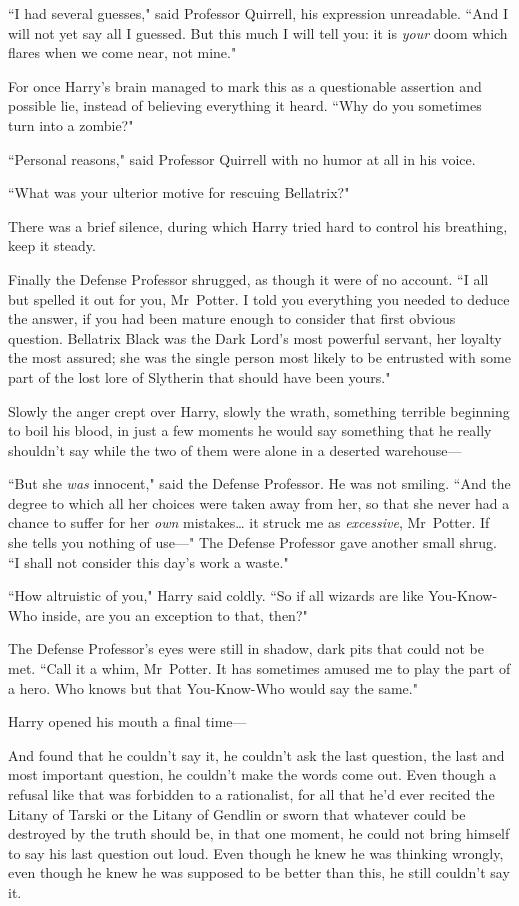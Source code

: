 ``I had several guesses," said Professor Quirrell, his expression unreadable. ``And I will not yet say all I guessed. But this much I will tell you: it is \emph{your} doom which flares when we come near, not mine."

For once Harry's brain managed to mark this as a questionable assertion and possible lie, instead of believing everything it heard. ``Why do you sometimes turn into a zombie?"

``Personal reasons," said Professor Quirrell with no humor at all in his voice.

``What was your ulterior motive for rescuing Bellatrix?"

There was a brief silence, during which Harry tried hard to control his breathing, keep it steady.

Finally the Defense Professor shrugged, as though it were of no account. ``I all but spelled it out for you, Mr~Potter. I told you everything you needed to deduce the answer, if you had been mature enough to consider that first obvious question. Bellatrix Black was the Dark Lord's most powerful servant, her loyalty the most assured; she was the single person most likely to be entrusted with some part of the lost lore of Slytherin that should have been yours."

Slowly the anger crept over Harry, slowly the wrath, something terrible beginning to boil his blood, in just a few moments he would say something that he really shouldn't say while the two of them were alone in a deserted warehouse—

``But she \emph{was} innocent," said the Defense Professor. He was not smiling. ``And the degree to which all her choices were taken away from her, so that she never had a chance to suffer for her \emph{own} mistakes{\ldots} it struck me as \emph{excessive}, Mr~Potter. If she tells you nothing of use—" The Defense Professor gave another small shrug. ``I shall not consider this day's work a waste."

``How altruistic of you," Harry said coldly. ``So if all wizards are like You-Know-Who inside, are you an exception to that, then?"

The Defense Professor's eyes were still in shadow, dark pits that could not be met. ``Call it a whim, Mr~Potter. It has sometimes amused me to play the part of a hero. Who knows but that You-Know-Who would say the same."

Harry opened his mouth a final time—

And found that he couldn't say it, he couldn't ask the last question, the last and most important question, he couldn't make the words come out. Even though a refusal like that was forbidden to a rationalist, for all that he'd ever recited the Litany of Tarski or the Litany of Gendlin or sworn that whatever could be destroyed by the truth should be, in that one moment, he could not bring himself to say his last question out loud. Even though he knew he was thinking wrongly, even though he knew he was supposed to be better than this, he still couldn't say it.

